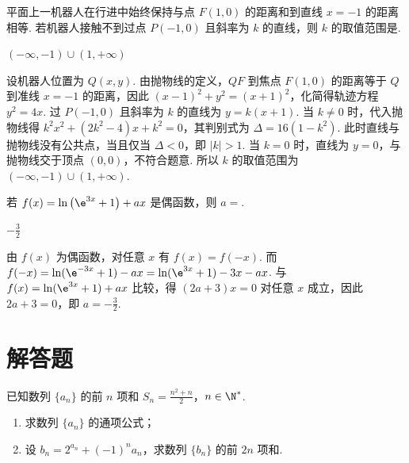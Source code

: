 \begin{problem}
平面上一机器人在行进中始终保持与点 \(F(1,0)\) 的距离和到直线 \(x = -1\) 的距离相等. 若机器人接触不到过点 \(P(-1,0)\) 且斜率为 \(k\) 的直线，则 \(k\) 的取值范围是\fillinblank{}.
\end{problem}

\begin{answer}
\((-\infty,-1)\cup(1,+\infty)\)
\end{answer}

\begin{solution}
设机器人位置为 \(Q(x,y)\). 由抛物线的定义，\(QF\) 到焦点 \(F(1,0)\) 的距离等于 \(Q\) 到准线 \(x=-1\) 的距离，因此 \((x-1)^2+y^2=(x+1)^2\)，化简得轨迹方程 \(y^2=4x\). 过 \(P(-1,0)\) 且斜率为 \(k\) 的直线为 \(y=k(x+1)\). 当 \(k\ne0\) 时，代入抛物线得 \(k^2x^2+(2k^2-4)x+k^2=0\)，其判别式为 \(\Delta=16(1-k^2)\). 此时直线与抛物线没有公共点，当且仅当 \(\Delta<0\)，即 \(|k|>1\). 当 \(k=0\) 时，直线为 \(y=0\)，与抛物线交于顶点 \((0,0)\)，不符合题意. 所以 \(k\) 的取值范围为 \((-\infty,-1)\cup(1,+\infty)\).
\end{solution}

\begin{problem}
若 \( f(x) = \ln\left(\e^{3x} + 1\right) + ax \) 是偶函数，则 \( a = \)\fillinblank{}.
\end{problem}

\begin{answer}
\(-\frac{3}{2}\)
\end{answer}

\begin{solution}
由 \(f(x)\) 为偶函数，对任意 \(x\) 有 \(f(x)=f(-x)\). 而 \(f(-x)=\ln(\e^{-3x}+1)-ax=\ln(\e^{3x}+1)-3x-ax\). 与 \(f(x)=\ln(\e^{3x}+1)+ax\) 比较，得 \((2a+3)x=0\) 对任意 \(x\) 成立，因此 \(2a+3=0\)，即 \(a=-\frac32\).
\end{solution}

\section{解答题}

\begin{problem}
已知数列 \(\{a_{n}\}\) 的前 \(n\) 项和 \(S_{n} = \frac{n^{2} + n}{2}\)，\(n \in \N^{*}\).

\begin{enumerate}
\item 求数列 \( \{a_{n}\} \) 的通项公式；
\item 设 \( b_{n} = 2^{a_{n}} + (-1)^{n}a_{n} \)，求数列 \( \{b_{n}\} \) 的前 \( 2n \) 项和.
\end{enumerate}
\end{problem}

